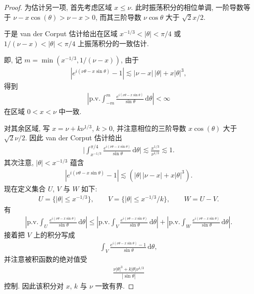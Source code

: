 \begin{proof}
为估计另一项, 首先考虑区域 $x \leq \nu$. 此时振荡积分的相位单调, 一阶导数等于 $\nu - x\cos(\theta) > \nu - x > 0$, 而其三阶导数 $\nu\cos\theta$ 大于 $\sqrt{2}x/2$.

于是 van der Corput 估计给出在区域 $x^{-1/3} < |\theta| < \pi/4$ 或 $1/(\nu - x) < |\theta| < \pi/4$ 上振荡积分的一致估计.

即, 记 $m = \min(x^{-1/3}, 1/(\nu - x))$, 由于
\begin{align*}
  |e^{i(\nu\theta-x\sin\theta)}-1|\lesssim|\nu-x|\,|\theta|+x|\theta|^{3},
\end{align*}
得到
\begin{align*}
  \left|\mathrm{p.v.}\int_{-m}^{m}\frac{e^{i(\nu\theta-x\sin\theta)}}{\sin\theta}\,\mathrm{d}\theta\right|<\infty
\end{align*}
在区域 $0 < x < \nu$ 中一致.

对其余区域, 写 $x = \nu + k\nu^{1/3}$, $k > 0$, 并注意相位的三阶导数 $x\cos(\theta)$ 大于 $\sqrt{2}\nu/2$. 因此 van der Corput 估计给出
\begin{align*}
  \Big|\int_{x^{-1/3}}^{\pi/4}\frac{e^{i(\nu\theta-x\sin\theta)}}{\sin\theta}\,\mathrm{d}\theta\Big|
  \lesssim\frac{x^{1/3}}{\nu^{1/3}}\lesssim 1.
\end{align*}
其次注意, $|\theta| < x^{-1/3}$ 蕴含
\begin{align*}
  |e^{i(\nu\theta-x\sin\theta)}-1|\lesssim(|\theta|\,|\nu-x|+x|\theta|^{3}).
\end{align*}
现在定义集合 $U$, $V$ 与 $W$ 如下:
\begin{align*}
  U=\{|{\theta}|\leq x^{-1/3}\},\qquad
  V=\{|{\theta}|\leq x^{-1/3}/k\},\qquad
  W=U-V.
\end{align*}
有
\begin{align*}
  \left|\mathrm{p.v.}\int_{U}\frac{e^{i(\nu\theta-x\sin\theta)}}{\sin\theta}\,\mathrm{d}\theta\right|
  \leq\left|\mathrm{p.v.}\int_{V}\frac{e^{i(\nu\theta-x\sin\theta)}}{\sin\theta}\,\mathrm{d}\theta\right|
  +\left|\mathrm{p.v.}\int_{W}\frac{e^{i(\nu\theta-x\sin\theta)}}{\sin\theta}\,\mathrm{d}\theta\right|.
\end{align*}
接着把 $V$ 上的积分写成
\begin{align*}
  \int_{V}\frac{e^{i(\nu\theta-x\sin\theta)}-1}{\sin\theta}\,\mathrm{d}\theta,
\end{align*}
并注意被积函数的绝对值受
\begin{align*}
  \frac{\nu|\theta|^{3}+k|\theta|\nu^{1/3}}{|\sin\theta|}
\end{align*}
控制. 因此该积分对 $x$, $k$ 与 $\nu$ 一致有界.


\end{proof}
